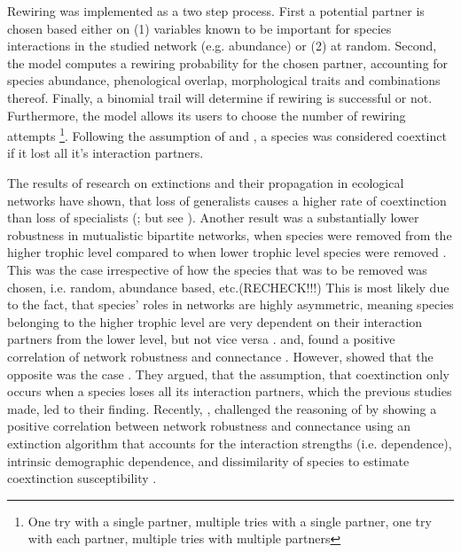 \documentclass[12pt,a4paper]{article}
\begin{document}
Rewiring was implemented as a two step process. First a potential partner is chosen based either on (1) variables known to be important for species interactions in the studied network (e.g. abundance) or (2) at random. Second, the model computes a rewiring probability for the chosen partner, accounting for species abundance, phenological overlap, morphological traits and combinations thereof. Finally, a binomial trail will determine if rewiring is successful or not. Furthermore, the model allows its users to choose the number of rewiring attempts \footnote{
One try with a single partner, 
multiple tries with a single partner, 
one try with each partner, 
multiple tries with multiple partners
}. Following the assumption of \citeauthor{memmott2004} and \citeauthor{dunne2002}, a species was considered coextinct if it lost all it's interaction partners.
\par

The results of research on extinctions and their propagation in ecological networks have shown, that loss of generalists causes a higher rate of coextinction than loss of specialists (\cite{memmott2004, kaiser-bunbury2010, traveset2017, bastazini2018, vizentin-bugoni2019, biella2020}; but see \cite{dunne2002}).
Another result was a substantially lower robustness in mutualistic bipartite networks, when species were removed from the higher trophic level compared to when lower trophic level species were removed \parencite{schleuning2016, traveset2017}. This was the case irrespective of how the species that was to be removed was chosen, i.e. random, abundance based, etc.(RECHECK!!!) This is most likely due to the fact, that species' roles in networks are highly asymmetric, meaning species belonging to the higher trophic level are very dependent on their interaction partners from the lower level, but not vice versa \parencite{bascompte2006}. 
\citeauthor{dunne2002, eklof2006} and, \citeauthor{thebault2010} found a positive correlation of network robustness and connectance \parencite{dunne2002, eklof2006, thebault2010}. However, \citeauthor{vieira2015} showed that the opposite was the case \parencite{vieira2015}. They argued, that the assumption, that coextinction only occurs when a species loses all its interaction partners, which the previous studies made, led to their finding. Recently, \citeauthor{baumgartner2020}, challenged the reasoning of \citeauthor{vieira2015} by showing a positive correlation between network robustness and connectance using an extinction algorithm that accounts for the interaction strengths (i.e. dependence), intrinsic demographic dependence, and dissimilarity of species to estimate coextinction susceptibility \parencite{baumgartner2020}. 
\end{document}
